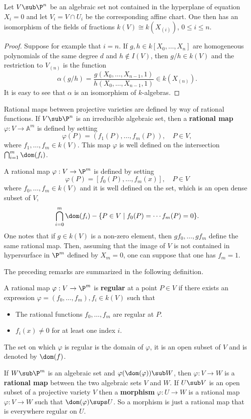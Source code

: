 \begin{proposition}
Let $V\sub\P^n$ be an algebraic set not contained in the hyperplane of equation $X_i=0$ and let $V_i=V\cap U_i$ be the corresponding affine chart. One then has an isomorphism of the fields of fractions $k(V)\cong k(X_{(i)})$, $0\leq i\leq n$.
\end{proposition}
\begin{proof}
Suppose for example that $i=n$. If $g,h\in k[X_0,\dots,X_{n}]$ are homogeneous polynomials of the same degree $d$ and $h\notin I(V)$, then $g/h\in k(V)$ and the restriction to $V_{(n)}$ is the function
\[\alpha(g/h)=\frac{g(X_0,\dots,X_{n-1},1)}{h(X_0,\dots,X_{n-1},1)}\in k(X_{(n)}).\]
It is easy to see that $\alpha$ is an isomorphism of $k$-algebras.
\end{proof}
Rational maps between projective varieties are defined by way of rational functions. If $V\sub\P^n$ is an irreducible algebraic set, then a \textbf{rational map} $\varphi:V\to\mathbb{A}^m$ is defined by setting
\[\varphi(P)=(f_1(P),\dots,f_m(P)),\quad P\in V,\]
where $f_1,\dots,f_m\in k(V)$. This map $\varphi$ is well defined on the intersection $\bigcap_{i=1}^{m}\dom(f_i)$.\par
A rational map $\varphi:V\to\P^m$ is defined by setting
\[\varphi(P)=[f_0(P),\dots,f_{m}(x)],\quad P\in V\]
where $f_0,\dots,f_{m}\in k(V)$ and it is well defined on the set, which is an open dense subset of $V$,
\[\bigcap_{i=0}^{m}\dom(f_i)-\{P\in V\mid f_0(P)=\cdots f_{m}(P)=0\}.\]
One notes that if $g\in k(V)$ is a non-zero element, then $gf_0,\dots,gf_{m}$ define the same rational map. Then, assuming that the image of $V$ is not contained in hypersurface in $\P^m$ defined by $X_{m}=0$, one can suppose that one has $f_{m}=1$.\par
The preceding remarks are summarized in the following definition.
\begin{definition}
A rational map $\varphi:V\to\P^m$ is \textbf{regular} at a point $P\in V$ if there
exists an expression $\varphi=(f_0,\dots,f_{m}),f_i\in k(V)$ such that
\begin{itemize}
\item The rational functions $f_0,\dots,f_{m}$ are regular at $P$.
\item $f_i(x)\neq 0$ for at least one index $i$.
\end{itemize}
The set on which $\varphi$ is regular is the domain of $\varphi$, it is an open subset of $V$ and is denoted by $\dom(f)$.
\end{definition}
If $W\sub\P^m$ is an algebraic set and $\varphi(\dom(\varphi))\sub W$, then $\varphi:V\to W$ is a \textbf{rational map} between the two algebraic sets $V$ and $W$. If $U\sub V$ is an open subset of a projective variety $V$ then a \textbf{morphism} $\varphi:U\to W$ is a rational map $\varphi:V\to W$ such that $\dom(\varphi)\sups U$. So a morphism is just a rational map that is everywhere regular on $U$.
